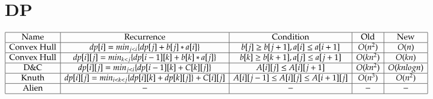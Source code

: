 \documentclass[a4paper,10pt,oneside]{article}
\begin{document}
\section{DP}
$\centering \begin{array}{|c|c|c|c|c|}
\hline
\text{Name} & \text{Recurrence} & \text{Condition} & \text{Old} & \text{New} \\ \hline
\text{Convex Hull} & dp[i] = min_{j < i}\{dp[j] + b[j]*a[i]\} & b[j] \ge b[j+1], a[i] \le a[i+1] & O(n^2) & O(n) \\ \hline
\text{Convex Hull} & dp[i][j] = min_{k < j}\{dp[i-1][k] + b[k]*a[j]\} & b[k] \ge b[k+1], a[j] \le a[j+1] & O(kn^2) & O(kn) \\ \hline
\text{D\&C} & dp[i][j] = min_{j < i}\{dp[i-1][k] + C[k][j]\} & A[i][j] \le A[i][j+1] & O(kn^2) & O(knlogn) \\ \hline
\text{Knuth} & dp[i][j] = min_{i < k < j}\{dp[i][k] + dp[k][j]\} + C[i][j] & A[i][j-1] \le A[i][j] \le A[i+1][j] & O(n^3) & O(n^2) \\ \hline
\text{Alien} & - & - & - & - \\ \hline
\end{array}$
\end{document}
